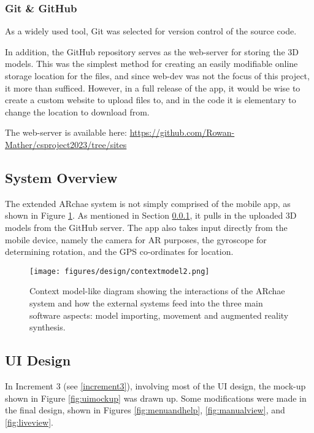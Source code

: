 \documentclass[12pt, a4paper]{article}
\begin{document}
\subsubsection{Git \& GitHub}
\label{gitandgithub}
As a widely used tool, Git was selected for version control of the source code. 

In addition, the GitHub repository serves as the web-server for storing the 3D models. This was the simplest method for creating an easily modifiable online storage location for the files, and since web-dev was not the focus of this project, it more than sufficed. However, in a full release of the app, it would be wise to create a custom website to upload files to, and in the code it is elementary to change the location to download from.

The web-server is available here: \url{https://github.com/Rowan-Mather/csproject2023/tree/sites} \cite{tools:repo}

\subsection{System Overview}
The extended ARchae system is not simply comprised of the mobile app, as shown in Figure \ref{fig:systemoverview}. As mentioned in Section \ref{gitandgithub}, it pulls in the uploaded 3D models from the GitHub server. The app also takes input directly from the mobile device, namely the camera for AR purposes, the gyroscope for determining rotation, and the GPS co-ordinates for location.

\begin{figure}[h!]
    \centering
    \texttt{[image: figures/design/contextmodel2.png]}
        \caption{Context model-like diagram showing the interactions of the ARchae system and how the external systems feed into the three main software aspects: model importing, movement and augmented reality synthesis.}
        \label{fig:systemoverview}
\end{figure}

\subsection{UI Design}
\label{uidesign}
In Increment 3 (see \ref{increment3}), involving most of the UI design, the mock-up shown in Figure \ref{fig:uimockup} was drawn up. Some modifications were made in the final design, shown in Figures \ref{fig:menuandhelp}, \ref{fig:manualview}, and \ref{fig:liveview}.
\end{document}
